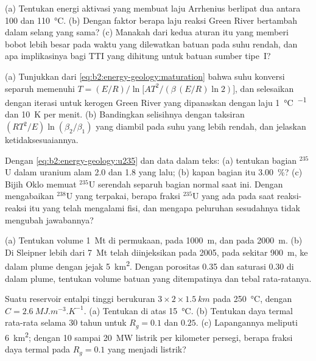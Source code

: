 \begin{exercise}[$\star\star$]\label{exo:b2:energy-geology:5}
(a) Tentukan energi aktivasi yang membuat laju Arrhenius berlipat dua antara 100 dan
\qty{110}{\celsius}. (b) Dengan faktor berapa laju reaksi Green River bertambah dalam selang
yang sama? (c) Manakah dari kedua aturan itu yang memberi bobot lebih besar pada waktu yang dilewatkan batuan pada suhu rendah,
dan apa implikasinya bagi TTI yang dihitung untuk batuan sumber tipe~I?
\end{exercise}

\begin{exercise}[$\star\star$]\label{exo:b2:energy-geology:6}
(a) Tunjukkan dari \eqref{eq:b2:energy-geology:maturation} bahwa suhu konversi separuh memenuhi
$T = (E/R)\big/\ln\bigl[A T^2/(\beta\,(E/R)\ln 2)\bigr]$, dan selesaikan dengan iterasi untuk kerogen Green
River yang dipanaskan dengan laju \qty{1}{\celsius\per\Ma} dan \qty{10}{K} per menit. (b) Bandingkan
selisihnya dengan taksiran $(RT^2/E)\ln(\beta_2/\beta_1)$ yang diambil pada suhu yang lebih rendah, dan
jelaskan ketidaksesuaiannya.
\end{exercise}

\begin{exercise}[$\star\star$]\label{exo:b2:energy-geology:7}
Dengan \eqref{eq:b2:energy-geology:u235} dan data dalam teks: (a) tentukan bagian $^{235}$U dalam
uranium alam \qty{2.0}{\Ga} dan \qty{1.8}{\Ga} yang lalu; (b) kapan bagian itu \qty{3.00}{\percent}?
(c) Bijih Oklo memuat $^{235}$U serendah separuh bagian normal saat ini. Dengan mengabaikan $^{238}$U
yang terpakai, berapa fraksi $^{235}$U yang ada pada saat reaksi-reaksi itu yang telah mengalami fisi, dan
mengapa peluruhan sesudahnya tidak mengubah jawabannya?
\end{exercise}

\begin{exercise}[$\star\star$]\label{exo:b2:energy-geology:8}
(a) Tentukan volume \qty{1}{Mt}  di permukaan, pada \qty{1000}{m}, dan pada
\qty{2000}{m}. (b) Di Sleipner lebih dari \qty{7}{Mt} telah diinjeksikan pada 2005, pada sekitar
\qty{900}{m}, ke dalam plume dengan jejak \qty{5}{km^2}. Dengan porositas 0.35 dan saturasi 
0.30 di dalam plume, tentukan volume batuan yang ditempatinya dan tebal rata-ratanya.
\end{exercise}

\begin{exercise}[$\star\star$]\label{exo:b2:energy-geology:9}
Suatu reservoir entalpi tinggi berukuran $3 \times 2 \times \qty{1.5}{km}$ pada \qty{250}{\celsius}, dengan
$C = \qty{2.6}{MJ.m^{-3}.K^{-1}}$. (a) Tentukan  di atas \qty{15}{\celsius}. (b) Tentukan
daya termal rata-rata selama 30 tahun untuk $R_g = 0.1$ dan $0.25$. (c) Lapangannya meliputi \qty{6}{km^2};
dengan 10 sampai \qty{20}{MW} listrik per kilometer persegi, berapa fraksi daya termal pada
$R_g = 0.1$ yang menjadi listrik?
\end{exercise}


